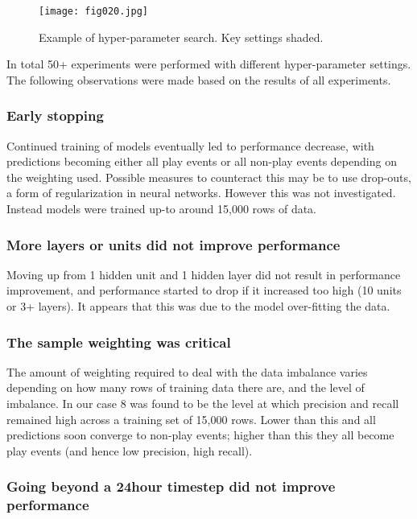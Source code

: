 \begin{figure}[h!]
	\centering
	\texttt{[image: fig020.jpg]}
	\caption{Example of hyper-parameter search. Key settings shaded.}
	\label{fig20}
\end{figure} 


In total 50+ experiments were performed with different hyper-parameter settings. The following observations were made based on the results of all experiments.

\subsubsection{Early stopping}

Continued training of models eventually led to performance decrease, with predictions becoming either all play events or all non-play events depending on the weighting used. Possible measures to counteract this may be to use drop-outs, a form of regularization in neural networks. However this was not investigated. Instead models were trained up-to around 15,000 rows of data.

\subsubsection{More layers or units did not improve performance}

Moving up from 1 hidden unit and 1 hidden layer did not result in performance improvement, and performance started to drop if it increased too high (10 units or 3+ layers). It appears that this was due to the model over-fitting the data.
 
\subsubsection{The sample weighting was critical}

The amount of weighting required to deal with the data imbalance varies depending on how many rows of training data there are, and the level of imbalance. In our case 8 was found to be the level at which precision and recall remained high across a training set of 15,000 rows. Lower than this and all predictions soon converge to non-play events; higher than this they all become play events (and hence low precision, high recall).

\subsubsection{Going beyond a 24hour timestep did not improve performance}

